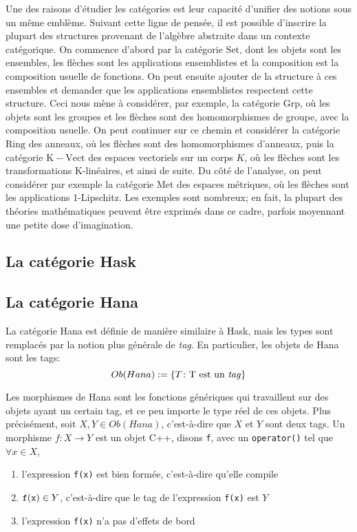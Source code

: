 Une des raisons d'étudier les catégories est leur capacité d'unifier des
notions sous un même emblème. Suivant cette ligne de pensée, il est possible
d'inscrire la plupart des structures provenant de l'algèbre abstraite dans
un contexte catégorique. On commence d'abord par la catégorie $\mathrm{Set}$,
dont les objets sont les ensembles, les flèches sont les applications
ensemblistes et la composition est la composition usuelle de fonctions.
On peut ensuite ajouter de la structure à ces ensembles et demander que
les applications ensemblistes respectent cette structure. Ceci nous mène
à considérer, par exemple, la catégorie $\mathrm{Grp}$, où les objets sont
les groupes et les flèches sont des homomorphismes de groupe, avec la
composition usuelle. On peut continuer sur ce chemin et considérer la
catégorie $\mathrm{Ring}$ des anneaux, où les flèches sont des homomorphismes
d'anneaux, puis la catégorie $\mathrm{K-Vect}$ des espaces vectoriels sur un
corps $K$, où les flèches sont les transformations K-linéaires, et ainsi de
suite. Du côté de l'analyse, on peut considérer par exemple la catégorie
$\mathrm{Met}$ des espaces métriques, où les flèches sont les applications
1-Lipschitz. Les exemples sont nombreux; en fait, la plupart des théories
mathématiques peuvent être exprimés dans ce cadre, parfois moyennant une
petite dose d'imagination.


\subsection{La catégorie Hask}


\subsection{La catégorie Hana}
La catégorie Hana est définie de manière similaire à Hask, mais les types
sont remplacés par la notion plus générale de \textit{tag}. En particulier,
les objets de Hana sont les tags:
\[
    Ob(Hana) := \{ T \colon \text{T est un \textit{tag}} \}
\]

Les morphismes de Hana sont les fonctions génériques qui travaillent sur des
objets ayant un certain tag, et ce peu importe le type réel de ces objets.
Plus précisément, soit $X, Y \in Ob(Hana)$, c'est-à-dire que $X$ et $Y$
sont deux tags. Un morphisme $f : X \to Y$ est un objet C++, disons {\tt f},
avec un {\tt operator()} tel que $\forall x \in X$,
\begin{enumerate}
    \item l'expression {\tt f(x)} est bien formée, c'est-à-dire qu'elle compile
    \item ${\tt f(x)} \in Y$, c'est-à-dire que le tag de l'expression {\tt f(x)} est $Y$
    \item l'expression {\tt f(x)} n'a pas d'effets de bord
\end{enumerate}

